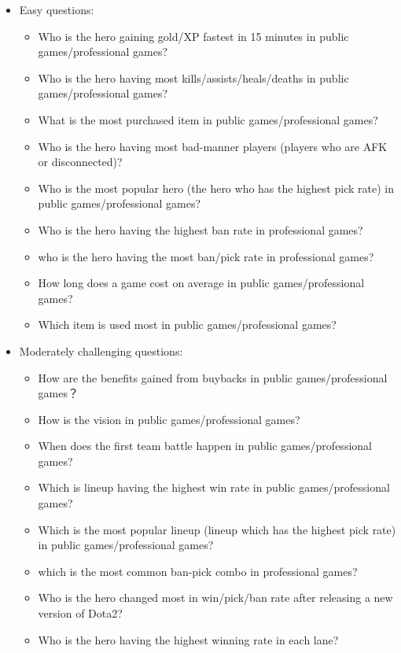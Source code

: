 \documentclass{article}
\begin{document}
\begin{itemize}
    \item Easy questions:
    \begin{itemize}
        \item Who is the hero gaining gold/XP fastest in 15 minutes in public games/professional games?
        \item Who is the hero having most kills/assists/heals/deaths in public games/professional games?
        \item What is the most purchased item in public games/professional games?
        \item Who is the hero having most bad-manner players (players who are AFK or disconnected)?
        \item Who is the most popular hero (the hero who has the highest pick rate) in public games/professional games?
        \item Who is the hero having the highest ban rate in professional games?
        \item who is the hero having the most ban/pick rate in professional games?
        \item How long does a game cost on average in public games/professional games?
        \item Which item is used most in public games/professional games?
    \end{itemize}
    \item Moderately challenging questions:
    \begin{itemize}
        \item How are the benefits gained from buybacks in public games/professional games？
        \item How is the vision in public games/professional games?
        \item When does the first team battle happen in public games/professional games?
        \item Which is lineup having the highest win rate in public games/professional games?
        \item Which is the most popular lineup (lineup which has the highest pick rate) in public games/professional games?
        \item which is the most common ban-pick combo in professional games?
        \item Who is the hero changed most in win/pick/ban rate after releasing a new version of Dota2?
        \item Who is the hero having the highest winning rate in each lane?

\end{itemize}
\end{itemize}
\end{document}
